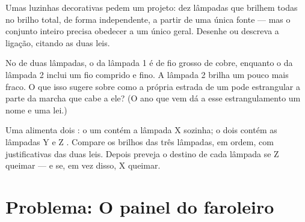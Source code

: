 \begin{exercise}[$\star\star$]\label{exo:g7:circuits-series-parallel:10}
Umas luzinhas decorativas pedem um projeto: dez lâmpadas que brilhem
todas no brilho total, de forma independente, a partir de uma única
fonte --- mas o conjunto inteiro precisa obedecer a um único
 geral. Desenhe ou descreva a ligação, citando as duas
leis.
\end{exercise}

\begin{exercise}[$\star\star$]\label{exo:g7:circuits-series-parallel:11}
No  de duas lâmpadas, o  da lâmpada 1 é de
fio grosso de cobre, enquanto o  da lâmpada 2 inclui um fio
comprido e fino. A lâmpada 2 brilha um pouco mais fraco. O que isso
sugere sobre como a própria estrada de um  pode estrangular a
parte da marcha que cabe a ele? (O ano que vem dá a esse
estrangulamento um nome e uma lei.)
\end{exercise}

\begin{exercise}[$\star\star\star$]\label{exo:g7:circuits-series-parallel:12}
Uma  alimenta dois  : o  um contém a lâmpada
X sozinha; o  dois contém as lâmpadas Y e Z . Compare os
brilhos das três lâmpadas, em ordem, com justificativas das duas
leis. Depois preveja o destino de cada lâmpada se Z queimar --- e se,
em vez disso, X queimar.
\end{exercise}

\section{Problema: O painel do faroleiro}

